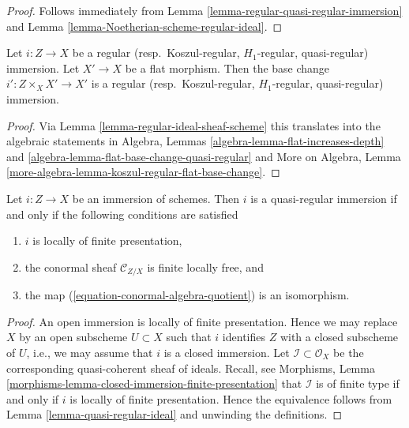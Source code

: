 \begin{proof}
Follows immediately from
Lemma \ref{lemma-regular-quasi-regular-immersion}
and
Lemma \ref{lemma-Noetherian-scheme-regular-ideal}.
\end{proof}

\begin{lemma}
\label{lemma-flat-base-change-regular-immersion}
Let $i : Z \to X$ be a regular (resp.\ Koszul-regular,
$H_1$-regular, quasi-regular) immersion. Let $X' \to X$ be a flat
morphism. Then the base change $i' : Z \times_X X' \to X'$
is a regular (resp.\ Koszul-regular,
$H_1$-regular, quasi-regular) immersion.
\end{lemma}

\begin{proof}
Via
Lemma \ref{lemma-regular-ideal-sheaf-scheme}
this translates into the algebraic statements in
Algebra, Lemmas \ref{algebra-lemma-flat-increases-depth} and
\ref{algebra-lemma-flat-base-change-quasi-regular}
and
More on Algebra,
Lemma \ref{more-algebra-lemma-koszul-regular-flat-base-change}.
\end{proof}

\begin{lemma}
\label{lemma-quasi-regular-immersion}
Let $i : Z \to X$ be an immersion of schemes. Then $i$ is a quasi-regular
immersion if and only if the following conditions are satisfied
\begin{enumerate}
\item $i$ is locally of finite presentation,
\item the conormal sheaf $\mathcal{C}_{Z/X}$ is finite locally free, and
\item the map (\ref{equation-conormal-algebra-quotient}) is an isomorphism.
\end{enumerate}
\end{lemma}

\begin{proof}
An open immersion is locally of finite presentation. Hence we may
replace $X$ by an open subscheme $U \subset X$ such that $i$ identifies
$Z$ with a closed subscheme of $U$, i.e., we may assume that $i$
is a closed immersion. Let $\mathcal{I} \subset \mathcal{O}_X$ be the
corresponding quasi-coherent sheaf of ideals. Recall, see
Morphisms, Lemma \ref{morphisms-lemma-closed-immersion-finite-presentation}
that $\mathcal{I}$ is of finite type if and only if $i$ is locally
of finite presentation. Hence the equivalence follows from
Lemma \ref{lemma-quasi-regular-ideal}
and unwinding the definitions.
\end{proof}

